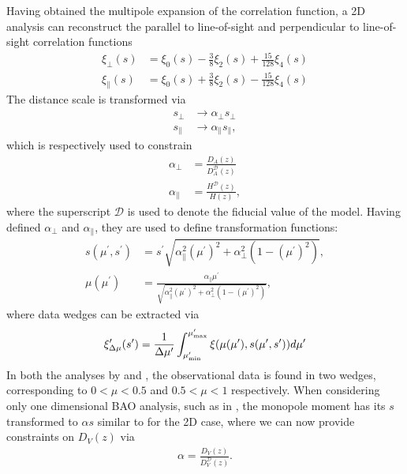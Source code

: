 \documentclass[titlesmallcaps, examinerscopy, copyrightpage]{uqthesis}
\begin{document}
Having obtained the multipole expansion of the correlation function, a 2D analysis can reconstruct the parallel to line-of-sight and perpendicular to line-of-sight correlation functions \citep{KazinSanchezBlanton2012, SanchezKazinBeutler2013}
\begin{align}
\xi_\perp(s) &= \xi_0(s) - \frac{3}{8} \xi_2(s) + \frac{15}{128} \xi_4(s) \\
\xi_\parallel(s) &= \xi_0(s) + \frac{3}{8} \xi_2(s) - \frac{15}{128} \xi_4(s)
\end{align}
The distance scale is transformed via
\begin{align}
s_\perp &\rightarrow \alpha_\perp s_\perp \\
s_\parallel &\rightarrow \alpha_\parallel s_\parallel,
\end{align}
which is respectively used to constrain
\begin{align}
\alpha_\perp &= \frac{D_A(z)}{D_A^{\mathcal{D}}(z)} \\
\alpha_\parallel &= \frac{H^{\mathcal{D}}(z)}{H(z)},
\end{align}
where the superscript $\mathcal{D}$ is used to denote the fiducial value of the model. Having defined $\alpha_\perp$ and $\alpha_\parallel$, they are used to define transformation functions:
\begin{align}
s(\mu^\prime, s^\prime) &= s^\prime \sqrt{\alpha_\parallel^2(\mu^\prime)^2 + \alpha_\perp^2 (1 - (\mu^\prime)^2)}, \\
\mu(\mu^\prime) &= \frac{\alpha_\parallel \mu^\prime}{\sqrt{\alpha_\parallel^2(\mu^\prime)^2 + \alpha_\perp^2 (1 - (\mu^\prime)^2)}},
\end{align}
where data wedges can be extracted via
\begin{align}
\xi^\prime_{\Delta \mu}(s^\prime) = \frac{1}{\Delta \mu^\prime} \int_{\mu^\prime_{\rm{min}}}^{\mu^\prime_{\rm{max}}} \xi(\mu(\mu^\prime), s(\mu^\prime, s^\prime)) d\mu^\prime
\end{align}
In both the analyses by \citet{KazinSanchezBlanton2012} and \citet{SanchezKazinBeutler2013}, the observational data is found in two wedges, corresponding to $0 < \mu < 0.5$ and $0.5 < \mu < 1$ respectively. When considering only one dimensional BAO analysis, such as in \citet{BlakeDavis2011}, the monopole moment has its $s$ transformed to $\alpha s$ similar to for the 2D case, where we can now provide constraints on $D_V(z)$ via
\begin{align}
\alpha = \frac{D_V(z)}{D_V^{\mathcal{D}}(z)}.
\end{align}
\end{document}
